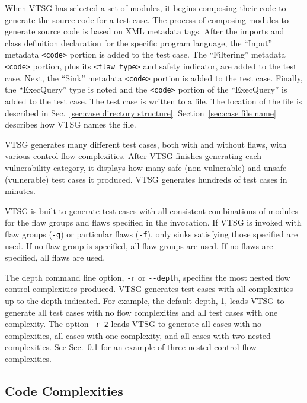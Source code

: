 \documentclass[12pt]{article}
\begin{document}
When VTSG has selected a set of modules, it begins composing
their code to generate the source code for a test case.
The process of composing modules to generate source code is
based on XML metadata tags.
After the imports and class definition declaration for the 
specific program
language, the ``Input'' metadata \verb|<code>| portion
is added to the test case.  
The ``Filtering'' metadata \verb|<code>| portion, plus its
\verb|<flaw type>| and safety indicator, are added to
the test case.  Next, the ``Sink'' metadata 
\verb|<code>| portion
is added to the test case.  Finally, the ``ExecQuery'' type is 
noted and the 
\verb|<code>| portion of the ``ExecQuery'' is added
to the 
test case.  The test case is written to a file.  
The location of the file is
described in Sec.~\ref{sec:case directory structure}.
Section~\ref{sec:case file name} describes how VTSG names the file.

VTSG generates many different test cases, both with and without
flaws, with various control flow complexities.  After VTSG finishes
generating each vulnerability category, it displays how many safe (non-vulnerable)
and unsafe (vulnerable) test cases it produced.
VTSG generates hundreds of test cases in minutes.

VTSG is built to generate test cases with all consistent combinations
of modules for the flaw groups and flaws specified in the invocation.
If VTSG is invoked with flaw groups (\verb|-g|) or particular flaws (\verb|-f|),
only sinks satisfying those specified are used.
If no flaw group is specified, all flaw groups are used.  
If no flaws are specified, all flaws are used.

\label{sec:depth of complexities}
The depth command line option, \verb|-r| or \verb|--depth|, 
specifies the
most nested flow control complexities produced.
VTSG generates test cases with all complexities up to the depth
indicated.
For example, the default depth, 1, leads VTSG to generate all
test cases with no flow complexities and all test cases with 
one complexity.  The option \verb|-r 2| leads VTSG to generate
all cases with no complexities, all cases with one complexity, 
and all cases with two nested complexities.
See Sec.~\ref{sec:code complexities} for an example of three 
nested control flow complexities.

\subsection{Code Complexities}
\label{sec:code complexities}
\end{document}
